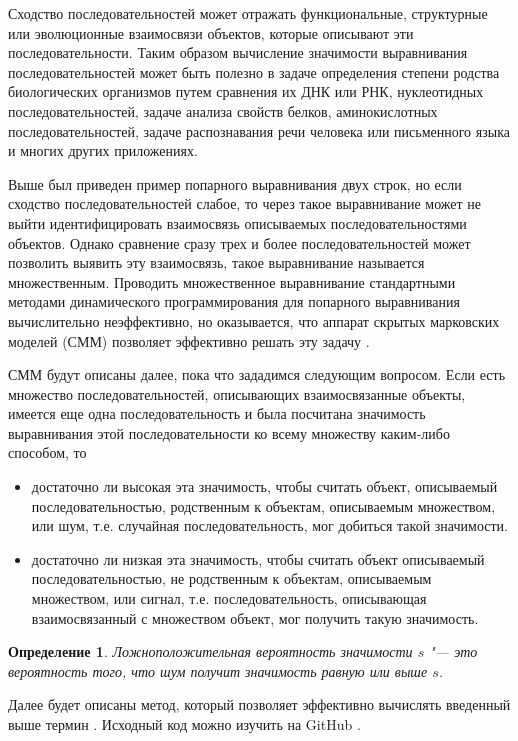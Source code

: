 \documentclass[specialist,
substylefile = spbu_report.rtx,
subf,href,colorlinks=true, 12pt]{disser}
\newtheorem{defenition}{Определение}
\begin{document}
		Сходство последовательностей может отражать функциональные, структурные или эволюционные взаимосвязи объектов, которые описывают эти последовательности. Таким образом вычисление значимости выравнивания последовательностей может быть полезно в задаче определения степени родства биологических организмов путем сравнения их ДНК или РНК, нуклеотидных последовательностей, задаче анализа свойств белков, аминокислотных последовательностей, задаче распознавания речи человека или письменного языка и многих других приложениях.
		
		Выше был приведен пример попарного выравнивания двух строк, но если сходство последовательностей слабое, то через такое выравнивание может не выйти идентифицировать взаимосвязь описываемых последовательностями объектов. Однако сравнение сразу трех и более последовательностей может позволить выявить эту взаимосвязь, такое выравнивание называется множественным. Проводить множественное выравнивание стандартными методами динамического программирования для попарного выравнивания \cite{Compeau2015} вычислительно неэффективно, но оказывается, что аппарат скрытых марковских моделей (СММ) позволяет эффективно решать эту задачу \cite{Dugad1996, Compeau2015a}. 
		
		СММ будут описаны далее, пока что зададимся следующим вопросом. Если есть множество последовательностей, описывающих взаимосвязанные объекты, имеется еще одна последовательность и была посчитана значимость выравнивания этой последовательности ко всему множеству каким-либо способом, то
		\begin{itemize}
			\item достаточно ли высокая эта значимость, чтобы считать объект, описываемый последовательностью, родственным к объектам, описываемым множеством, или шум, т.е. случайная последовательность, мог добиться такой значимости.
			\item достаточно ли низкая эта значимость, чтобы считать объект описываемый последовательностью, не родственным к объектам, описываемым множеством, или сигнал, т.е. последовательность, описывающая взаимосвязанный с множеством объект, мог получить такую значимость. 
		\end{itemize}
	
		\begin{defenition}
			Ложноположительная вероятность значимости $s$ "--- это вероятность того, что шум получит значимость равную или выше $s$.  
		\end{defenition}		
		
		Далее будет описаны метод, который позволяет эффективно вычислять введенный выше термин \cite{Newberg2009}. Исходный код можно изучить на GitHub \cite{Vlasenko2022}.
		
\end{document}
